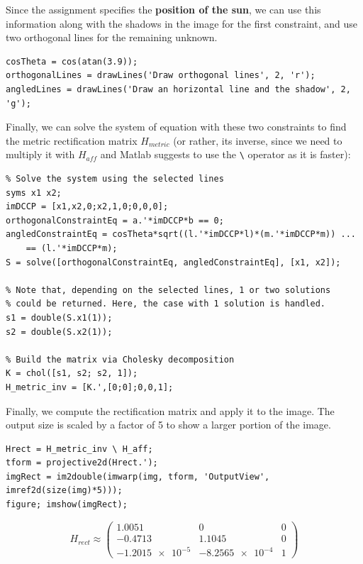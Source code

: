 \documentclass{Configuration_Files/PoliMi3i_thesis}
\begin{document}
Since the assignment specifies the \textbf{position of the sun}, we can use this information along with the shadows in the image for the first constraint, and use two orthogonal lines for the remaining unknown.

\begin{verbatim}
cosTheta = cos(atan(3.9));
orthogonalLines = drawLines('Draw orthogonal lines', 2, 'r');
angledLines = drawLines('Draw an horizontal line and the shadow', 2, 'g');
\end{verbatim}
\newpage

Finally, we can solve the system of equation with these two constraints to find the metric rectification matrix $H_{metric}$ (or rather, its inverse, since we need to multiply it with $H_{aff}$ and Matlab suggests to use the \verb|\| operator as it is faster):

\begin{verbatim}
% Solve the system using the selected lines
syms x1 x2;
imDCCP = [x1,x2,0;x2,1,0;0,0,0];
orthogonalConstraintEq = a.'*imDCCP*b == 0;
angledConstraintEq = cosTheta*sqrt((l.'*imDCCP*l)*(m.'*imDCCP*m)) ...
	== (l.'*imDCCP*m);
S = solve([orthogonalConstraintEq, angledConstraintEq], [x1, x2]);

% Note that, depending on the selected lines, 1 or two solutions
% could be returned. Here, the case with 1 solution is handled.
s1 = double(S.x1(1));
s2 = double(S.x2(1));

% Build the matrix via Cholesky decomposition
K = chol([s1, s2; s2, 1]);
H_metric_inv = [K.',[0;0];0,0,1];
\end{verbatim}

Finally, we compute the rectification matrix and apply it to the image. The output size is scaled by a factor of 5 to show a larger portion of the image.

\begin{verbatim}
Hrect = H_metric_inv \ H_aff;
tform = projective2d(Hrect.');
imgRect = im2double(imwarp(img, tform, 'OutputView', imref2d(size(img)*5)));
figure; imshow(imgRect);
\end{verbatim}

\[
H_{rect} \approx
\begin{pmatrix}
1.0051 & 0 & 0\\
-0.4713 & 1.1045 & 0\\
\num{-1.2015e-5} & \num{-8.2565e-4} & 1
\end{pmatrix}
\]
\end{document}
